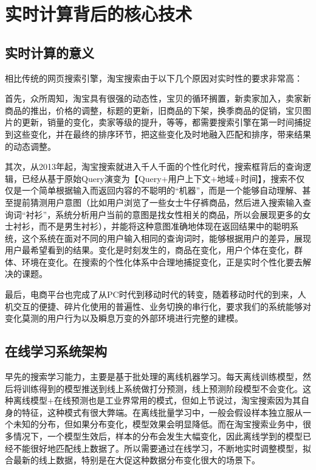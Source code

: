 
\chapter{实时计算背后的核心技术}
\thispagestyle{empty}

\setlength{\fboxrule}{0pt}\setlength{\fboxsep}{0cm}
\noindent\shadowbox{
\begin{tcolorbox}[arc=0mm,colback=lightblue,colframe=darkblue,title=学习目标与要求]

\end{tcolorbox}}
\setlength{\fboxrule}{1pt}\setlength{\fboxsep}{4pt} 

\section{实时计算的意义}
相比传统的网页搜索引擎，淘宝搜索由于以下几个原因对实时性的要求非常高：

首先，众所周知，淘宝具有很强的动态性，宝贝的循环搁置，新卖家加入，卖家新商品的推出，价格的调整，标题的更新，旧商品的下架，换季商品的促销，宝贝图片的更新，销量的变化，卖家等级的提升，等等，都需要搜索引擎在第一时间捕捉到这些变化，并在最终的排序环节，把这些变化及时地融入匹配和排序，带来结果的动态调整。

其次，从2013年起，淘宝搜索就进入千人千面的个性化时代，搜索框背后的查询逻辑，已经从基于原始Query演变为【Query+用户上下文+地域+时间】，搜索不仅仅是一个简单根据输入而返回内容的不聪明的“机器”，而是一个能够自动理解、甚至提前猜测用户意图（比如用户浏览了一些女士牛仔裤商品，然后进入搜索输入查询词“衬衫”，系统分析用户当前的意图是找女性相关的商品，所以会展现更多的女士衬衫，而不是男生衬衫），并能将这种意图准确地体现在返回结果中的聪明系统，这个系统在面对不同的用户输入相同的查询词时，能够根据用户的差异，展现用户最希望看到的结果。变化是时刻发生的，商品在变化，用户个体在变化，群体、环境在变化。在搜索的个性化体系中合理地捕捉变化，正是实时个性化要去解决的课题。

最后，电商平台也完成了从PC时代到移动时代的转变，随着移动时代的到来，人机交互的便捷、碎片化使用的普遍性、业务切换的串行化，要求我们的系统能够对变化莫测的用户行为以及瞬息万变的外部环境进行完整的建模。

\section{在线学习系统架构}
早先的搜索学习能力，主要是基于批处理的离线机器学习。每天离线训练模型，然后将训练得到的模型推送到线上系统做打分预测，线上预测阶段模型不会变化。这种离线模型+在线预测也是工业界常用的模式，但如上节说过，淘宝搜索因为其自身的特征，这种模式有很大弊端。在离线批量学习中，一般会假设样本独立服从一个未知的分布，但如果分布变化，模型效果会明显降低。而在淘宝搜索业务中，很多情况下，一个模型生效后，样本的分布会发生大幅变化，因此离线学到的模型已经不能很好地匹配线上数据了。所以需要通过在线学习，不断地实时调整模型，拟合最新的线上数据，特别是在大促这种数据分布变化很大的场景下。

